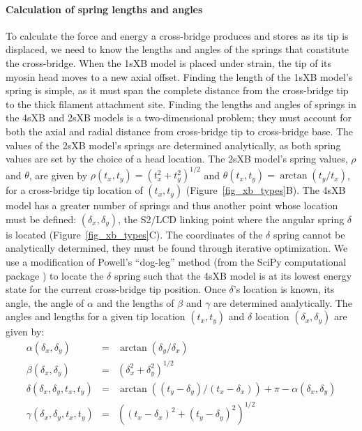 \documentclass[10pt]{article}
\newcommand{\citep}[1]{\cite{#1}} %
\begin{document}
\paragraph{Calculation of spring lengths and angles} %
To calculate the force and energy a cross-bridge produces and stores as its tip is displaced, we need to know the lengths and angles of the springs that constitute the cross-bridge. 
When the 1sXB model is placed under strain, the tip of its myosin head moves to a new axial offset. 
Finding the length of the 1sXB model's spring is simple, as it must span the complete distance from the cross-bridge tip to the thick filament attachment site. 
Finding the lengths and angles of springs in the 4sXB and 2sXB models is a two-dimensional problem; they must account for both the axial and radial distance from cross-bridge tip to cross-bridge base.
The values of the 2sXB model's springs are determined analytically, as both spring values are set by the choice of a head location. 
The 2sXB model's spring values, $\rho$ and $\theta$, are given by $\rho(t_x, t_y)=(t_x^2 + t_y^2)^{1/2}$ and $\theta(t_x, t_y)=\arctan(t_y/t_x)$, for a cross-bridge tip location of $(t_x, t_y)$ (Figure~\ref{fig_xb_types}B). 
The 4sXB model has a greater number of springs and thus another point whose location must be defined: $(\delta_x, \delta_y)$, the S2/LCD linking point where the angular spring $\delta$ is located (Figure~\ref{fig_xb_types}C). 
The coordinates of the $\delta$ spring cannot be analytically determined, they must be found through iterative optimization. 
We use a modification of Powell's ``dog-leg'' method (from the SciPy computational package \citep{SciPy}) to locate the $\delta$ spring such that the 4sXB model is at its lowest energy state for the current cross-bridge tip position.
Once $\delta$'s location is known, its angle, the angle of $\alpha$ and the lengths of $\beta$ and $\gamma$ are determined analytically.
The angles and lengths for a given tip location $(t_x, t_y)$ and $\delta$ location $(\delta_x, \delta_y)$ are given by:
\begin{eqnarray*}
\label{4sXB_spring_values}
\alpha(\delta_x, \delta_y) &=& \arctan(\delta_y/\delta_x) \\
\beta(\delta_x, \delta_y) &=& (\delta_x^2 + \delta_y^2)^{1/2} \\
\delta(\delta_x, \delta_y, t_x, t_y) &=& \arctan((t_y-\delta_y)/(t_x-\delta_x)) + \pi - \alpha(\delta_x, \delta_y) \\
\gamma(\delta_x, \delta_y, t_x, t_y) &=& ((t_x-\delta_x)^2 + (t_y-\delta_y)^2)^{1/2} 
\end{eqnarray*}
\end{document}
